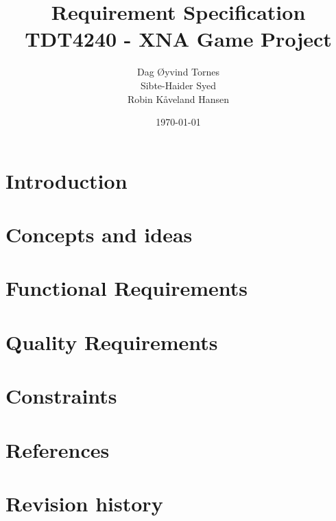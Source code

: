 \documentclass[titlepage,a4paper,11pt]{article}
\date{\today}
\begin{document}
\title{Requirement Specification\\
 		TDT4240 - XNA Game Project}

\author{Dag Øyvind Tornes\\
 		Sibte-Haider Syed\\ 
		Robin Kåveland Hansen\\}
\maketitle

\pagestyle{empty}
\tableofcontents
\clearpage
\pagestyle{plain}

\section{Introduction}


\section{Concepts and ideas}
\label{concepts}


\section{Functional Requirements}
\label{funcreq}








% 

\section{Quality Requirements}
\label{qualreq}

\section{Constraints}
\label{constraints}
%

\section{References}


\section{Revision history}
\end{document}
